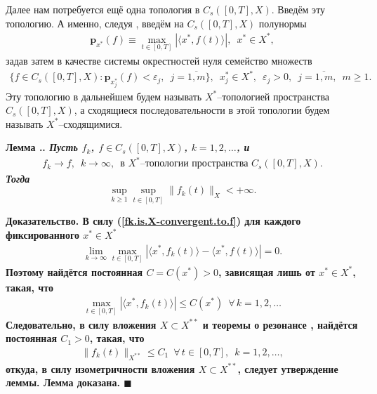 \documentclass{report}
\newcounter{lem}[section]
\renewcommand{\thelem}{\thesection.\arabic{lem}}
\newenvironment{Lemma}{\par\refstepcounter{lem}\bf Лемма \thelem. \it}{\rm\par}
\newenvironment{Proof}{\par\noindent\bf Доказательство.\rm}{ $\blacksquare$\par}
\begin{document}
Далее нам потребуется ещё одна топология в $C_s([0,T],X)$. Введём эту топологию. А именно, следуя \cite[теорема 1.2 на стр.149]{Gaevskij:Greger:Zaharias}, введём на $C_s([0,T],X)$
полунормы
\begin{gather*}
\mathbf{p}_{x^*}(f)\equiv\max\limits_{t\in[0,T]}|\langle x^*,f(t)\rangle|,\,\,\,x^*\in X^*,
\end{gather*}
задав затем в качестве системы окрестностей нуля семейство множеств
\begin{gather*}
\{f\in C_s([0,T],X):\mathbf{p}_{x^*_j}(f)<\varepsilon_j,\,\,\,j=\overline{1,m}\},\,\,\,x^*_j\in X^*,\,\,\,\varepsilon_j>0,\,\,\,j=\overline{1,m},\,\,\,m\geqslant1.
\end{gather*}
Эту топологию в дальнейшем будем называть $X^*$--топологией пространства $C_s([0,T],X)$, а сходящиеся последовательности в этой топологии будем называть $X^*$--сходящимися.

\begin{Lemma}\label{boundness.of.X-convergence.sequence}
Пусть $f_k$, $f\in C_s([0,T],X)$, $k=1,2,\dots$, и
\begin{gather}\label{fk.is.X-convergent.to.f}
f_k\to f,\,\,\,k\to\infty,\,\,\,\text{в $X^*$--топологии пространства $C_s([0,T],X)$}.
\end{gather}
Тогда
$$
\sup\limits_{k\geqslant1}\sup\limits_{t\in[0,T]}\|f_k(t)\|_X<+\infty.
$$
\end{Lemma}
\begin{Proof}
В силу (\ref{fk.is.X-convergent.to.f}) для каждого фиксированного $x^*\in X^*$
\begin{gather*}
\lim\limits_{k\to\infty}\max\limits_{t\in[0,T]}|\langle x^*,f_k(t)\rangle-\langle x^*,f(t)\rangle|=0.
\end{gather*}
Поэтому найдётся постоянная $C=C(x^*)>0$, зависящая лишь от $x^*\in X^*$, такая, что
\begin{gather*}
\max\limits_{t\in[0,T]}|\langle x^*,f_k(t)\rangle|\leqslant C(x^*)\,\,\,\forall\,k=1,2,\dots
\end{gather*}
Следовательно, в силу вложения $X\subset X^{**}$ и теоремы о резонансе \cite[следствие 1 на стр.104]{iosida}, найдётся постоянная $C_1>0$, такая, что
\begin{gather*}
\|f_k(t)\|_{X^{**}}\leqslant C_1\,\,\,\forall\,t\in[0,T],\,\,\,k=1,2,\dots,
\end{gather*}
откуда, в силу изометричности вложения $X\subset X^{**}$, следует утверждение леммы. Лемма доказана.
\end{Proof}
\end{document}
